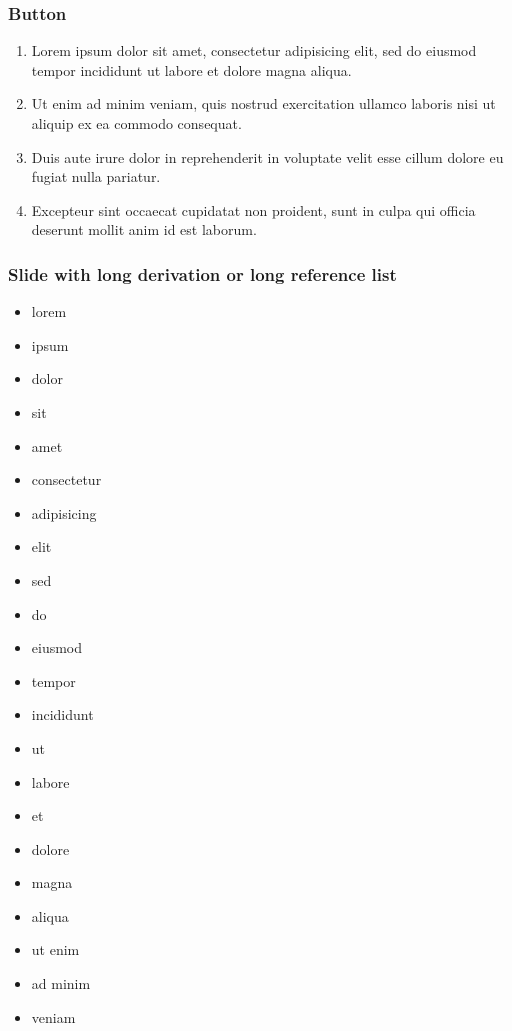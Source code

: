 \documentclass[11pt,xcolor={dvipsnames},hyperref={pdftex,pdfpagemode=UseNone,hidelinks,pdfdisplaydoctitle=true},usepdftitle=false]{beamer}
\begin{document}
\begin{frame}[label=firstSlide]
\frametitle{Button}
\begin{enumerate}
\item Lorem ipsum dolor sit amet, consectetur adipisicing elit, sed do eiusmod
tempor incididunt ut labore et dolore magna aliqua.
\item  Ut enim ad minim veniam, quis nostrud exercitation ullamco laboris nisi ut aliquip ex ea commodo consequat. 
\item Duis aute irure dolor in reprehenderit in voluptate velit esse
cillum dolore eu fugiat nulla pariatur. 
\item Excepteur sint occaecat cupidatat non proident, sunt in culpa qui officia deserunt mollit anim id est laborum.
\end{enumerate}
\hyperlink{backupSlide}{}
\hyperlink{anotherBackupSlide}{}
\end{frame}

\begin{frame}[allowframebreaks=0.8]
\frametitle{Slide with long derivation or long reference list}
\begin{itemize}
\item lorem 
\item ipsum 
\item dolor 
\item sit 
\item amet
\item consectetur 
\item adipisicing 
\item elit
\item sed
\item do
\item eiusmod
\item tempor
\item incididunt
\item ut
\item labore
\item et 
\item dolore 
\item magna 
\item aliqua
\item ut enim
\item ad minim 
\item veniam
\end{itemize}
\end{frame}

\lastslide
\end{document}
